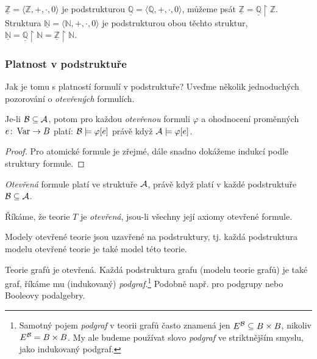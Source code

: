 \begin{example}
    $\underline{\mathbb Z}=\langle\mathbb Z,+,\cdot,0\rangle$ je podstrukturou $\underline{\mathbb Q}=\langle\mathbb Q,+,\cdot,0\rangle$, můžeme psát $\underline{\mathbb Z}=\underline{\mathbb Q}\restriction\mathbb Z$. Struktura $\underline{\mathbb N}=\langle \mathbb N,+,\cdot,0\rangle$ je podstrukturou obou těchto struktur, $\underline{\mathbb N}=\underline{\mathbb Q}\restriction\mathbb N=\underline{\mathbb Z}\restriction\mathbb N$.
\end{example}

\subsubsection{Platnost v podstruktuře}

Jak je tomu s platností formulí v podstruktuře? Uveďme několik jednoduchých pozorování o \emph{otevřených} formulích.

\begin{observation}
    Je-li $\mathcal{B}\subseteq\mathcal{A}$, potom pro každou \emph{otevřenou} formuli $\varphi$ a ohodnocení proměnných $e\colon\operatorname{Var}\to B$ platí: $\mathcal{B}\models\varphi[e]$ právě když $\mathcal{A}\models\varphi[e]$.
\end{observation}
\begin{proof}
    Pro atomické formule je zřejmé, dále snadno dokážeme indukcí podle struktury formule.
\end{proof}

\begin{corollary}
    \emph{Otevřená} formule platí ve struktuře $\mathcal{A}$, právě když platí v každé podstruktuře $\mathcal{B}\subseteq\mathcal{A}$.
\end{corollary}

Říkáme, že teorie $T$ je \emph{otevřená}, jsou-li všechny její axiomy otevřené formule.

\begin{corollary}
    Modely otevřené teorie jsou uzavřené na podstruktury, tj. každá podstruktura modelu otevřené teorie je také model této teorie.
\end{corollary}

\begin{example}
    Teorie grafů je otevřená. Každá podstruktura grafu (modelu teorie grafů) je také graf, říkáme mu (indukovaný) \emph{podgraf}.\footnote{Samotný pojem \emph{podgraf} v teorii grafů často znamená jen $E^{\mathcal{B}}\subseteq B\times B$, nikoliv $E^{\mathcal{B}}=B\times B$. My ale budeme používat slovo \emph{podgraf} ve striktnějším smyslu, jako indukovaný podgraf.} Podobně např. pro podgrupy nebo Booleovy podalgebry.
\end{example}

